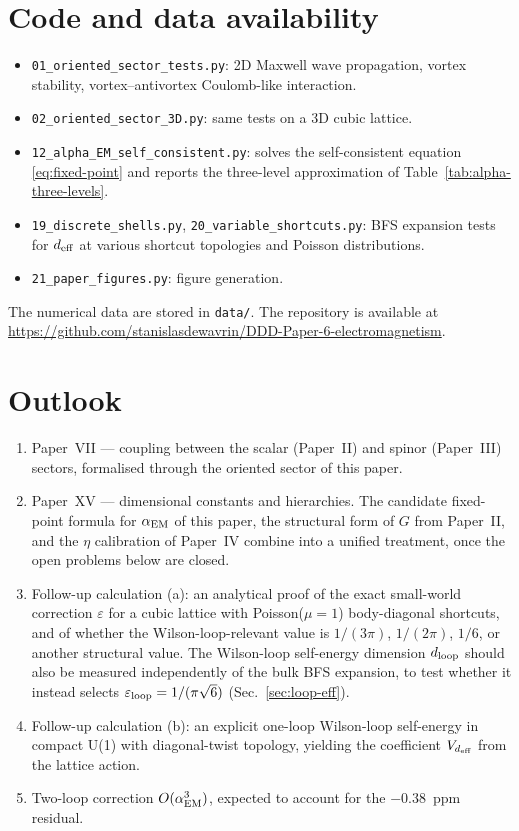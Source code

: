 \documentclass[11pt,a4paper]{article}
\begin{document}
\section{Code and data availability}
\label{sec:code}

\begin{itemize}
\item \texttt{01\_oriented\_sector\_tests.py}: 2D Maxwell wave
propagation, vortex stability, vortex--antivortex Coulomb-like
interaction.
\item \texttt{02\_oriented\_sector\_3D.py}: same tests on a 3D
cubic lattice.
\item \texttt{12\_alpha\_EM\_self\_consistent.py}: solves the
self-consistent equation \eqref{eq:fixed-point} and reports the
three-level approximation of
Table~\ref{tab:alpha-three-levels}.
\item \texttt{19\_discrete\_shells.py},
\texttt{20\_variable\_shortcuts.py}: BFS expansion tests for
$d_{\rm eff}$ at various shortcut topologies and Poisson
distributions.
\item \texttt{21\_paper\_figures.py}: figure generation.
\end{itemize}
The numerical data are stored in \texttt{data/}. The repository
is available at
\url{https://github.com/stanislasdewavrin/DDD-Paper-6-electromagnetism}.

\section{Outlook}
\label{sec:outlook}

\begin{enumerate}
\item Paper~VII --- coupling between the scalar (Paper~II) and
spinor (Paper~III) sectors, formalised through the oriented
sector of this paper.
\item Paper~XV --- dimensional constants and hierarchies. The
candidate fixed-point formula for $\alpha_{\rm EM}$ of this
paper, the structural form of $G$ from Paper~II, and the $\eta$
calibration of Paper~IV combine into a unified treatment, once
the open problems below are closed.
\item Follow-up calculation (a): an analytical proof of the
exact small-world correction $\varepsilon$ for a cubic lattice
with Poisson($\mu = 1$) body-diagonal shortcuts, and of whether
the Wilson-loop-relevant value is $1/(3\pi)$, $1/(2\pi)$, $1/6$,
or another structural value. The Wilson-loop self-energy
dimension $d_{\rm loop}$ should also be measured independently
of the bulk BFS expansion, to test whether it instead selects
$\varepsilon_{\rm loop} = 1/(\pi\sqrt{6})$
(Sec.~\ref{sec:loop-eff}).
\item Follow-up calculation (b): an explicit one-loop
Wilson-loop self-energy in compact U(1) with diagonal-twist
topology, yielding the coefficient $V_{d_{\rm eff}}$ from the
lattice action.
\item Two-loop correction $O(\alpha_{\rm EM}^3)$, expected to
account for the $-0.38$~ppm residual.
\end{enumerate}
\end{document}

